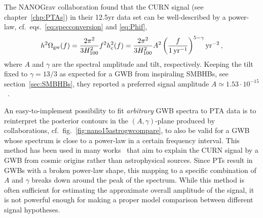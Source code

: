 The \ac{NANOGrav} collaboration found that the \ac{CURN} signal (see chapter~\ref{chp:PTAs}) in their 12.5yr data set can be well-described by a power-law, cf.~eqs.~\eqref{eq:specconversion} and \eqref{eq:Phif},
\begin{align}
	h^2 \Omega_{\text{gw}}(f) = \frac{2 \pi^2}{3 H_{100}^2} f^2 h_\text{c}^2(f) = \frac{2 \pi^2}{3 H_{100}^2} A^2  \left( \frac{f}{1 \, \text{yr}^{-1}} \right)^{5 - \gamma} \text{yr}^{-2} \, , \label{eq:PTA_power_law}
\end{align}
where $A$ and $\gamma$ are the spectral amplitude and tilt, respectively. Keeping the tilt fixed to $\gamma = 13/3$ as expected for a \ac{GWB} from inspiraling \acp{SMBHB}, see section~\ref{sec:SMBHBs}, they reported a preferred signal amplitude $A \simeq 1.53 \cdot 10^{-15}$~\cite{NANOGrav:2020bcs}.

An easy-to-implement possibility to fit \textit{arbitrary} \ac{GWB} spectra to \ac{PTA} data is to reinterpret the posterior contours in the $(A, \gamma)$-plane produced by collaborations, cf.~fig.~\ref{fig:nano15astrogwcompare}, to also be  valid for a \ac{GWB} whose spectrum is close to a power-law in a certain frequency interval. This method has been used in many works~\cite{Freese:2022qrl, Benetti:2021uea, Blasi:2020mfx, Ellis:2020ena, Vaskonen:2020lbd, Buchmuller:2020lbh} that aim to explain the \ac{CURN} signal by a \ac{GWB} from cosmic origins rather than astrophysical sources. 
Since \acp{PT} result in \acp{GWB} with a broken power-law shape, this mapping to a specific combination of $A$ and $\gamma$ breaks down around the peak of the spectrum. While this method is often sufficient for estimating the approximate overall amplitude of the signal, it is not powerful enough for making a proper model comparison between different signal hypotheses.

